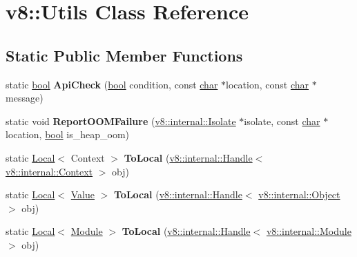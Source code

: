 \hypertarget{classv8_1_1Utils}{}\section{v8\+:\+:Utils Class Reference}
\label{classv8_1_1Utils}
\subsection*{Static Public Member Functions}
\begin{DoxyCompactItemize}
\item 
\mbox{\label{classv8_1_1Utils_a1a1e634bae095bf6ff0ed2d9d737be00}} 
static \mbox{\hyperlink{classbool}{bool}} {\bfseries Api\+Check} (\mbox{\hyperlink{classbool}{bool}} condition, const \mbox{\hyperlink{classchar}{char}} $\ast$location, const \mbox{\hyperlink{classchar}{char}} $\ast$message)
\item 
\mbox{\label{classv8_1_1Utils_aaa8135dbef2418a30869ad63568d0f4b}} 
static void {\bfseries Report\+O\+O\+M\+Failure} (\mbox{\hyperlink{classv8_1_1internal_1_1Isolate}{v8\+::internal\+::\+Isolate}} $\ast$isolate, const \mbox{\hyperlink{classchar}{char}} $\ast$location, \mbox{\hyperlink{classbool}{bool}} is\+\_\+heap\+\_\+oom)
\item 
\mbox{\label{classv8_1_1Utils_a3e12eece90343f71b7782f7b6c0c0f7b}} 
static \mbox{\hyperlink{classv8_1_1Local}{Local}}$<$ Context $>$ {\bfseries To\+Local} (\mbox{\hyperlink{classv8_1_1internal_1_1Handle}{v8\+::internal\+::\+Handle}}$<$ \mbox{\hyperlink{classv8_1_1internal_1_1Context}{v8\+::internal\+::\+Context}} $>$ obj)
\item 
\mbox{\label{classv8_1_1Utils_ae1c9265aa9041c666f09dd8aff84c293}} 
static \mbox{\hyperlink{classv8_1_1Local}{Local}}$<$ \mbox{\hyperlink{classv8_1_1Value}{Value}} $>$ {\bfseries To\+Local} (\mbox{\hyperlink{classv8_1_1internal_1_1Handle}{v8\+::internal\+::\+Handle}}$<$ \mbox{\hyperlink{classv8_1_1internal_1_1Object}{v8\+::internal\+::\+Object}} $>$ obj)
\item 
\mbox{\label{classv8_1_1Utils_a62d35daa157cfe8ef495a39121935f28}} 
static \mbox{\hyperlink{classv8_1_1Local}{Local}}$<$ \mbox{\hyperlink{classv8_1_1Module}{Module}} $>$ {\bfseries To\+Local} (\mbox{\hyperlink{classv8_1_1internal_1_1Handle}{v8\+::internal\+::\+Handle}}$<$ \mbox{\hyperlink{classv8_1_1internal_1_1Module}{v8\+::internal\+::\+Module}} $>$ obj)

\end{DoxyCompactItemize}
